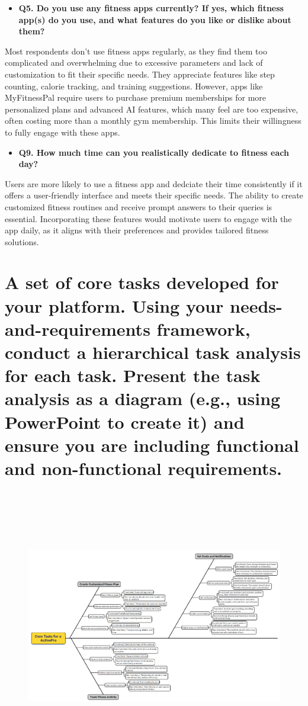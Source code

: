 \documentclass[letterpaper,11pt]{texMemo} %
\begin{document}
\begin{itemize}
	\item \bfseries{Q5. Do you use any fitness apps currently? If yes, which fitness app(s) do you use, and what features do you like or dislike about them?}
\end{itemize}


Most respondents don’t use fitness apps regularly, as they find them too complicated and overwhelming due to excessive parameters and lack of customization to fit their specific needs. They appreciate features like step counting, calorie tracking, and training suggestions. However, apps like MyFitnessPal require users to purchase premium memberships for more personalized plans and advanced AI features, which many feel are too expensive, often costing more than a monthly gym membership. This limits their willingness to fully engage with these apps.

\begin{itemize}
	\item \bfseries{Q9. How much time can you realistically dedicate to fitness each day?
	}
\end{itemize}

Users are more likely to use a fitness app and dedciate their time consistently if it offers a user-friendly interface and meets their specific needs. The ability to create customized fitness routines and receive prompt answers to their queries is essential. Incorporating these features would motivate users to engage with the app daily, as it aligns with their preferences and provides tailored fitness solutions.

\section{A set of core tasks developed for your platform. Using your needs-and-requirements framework, conduct a hierarchical task analysis for each task. Present the task analysis as a diagram (e.g., using PowerPoint to create it) and ensure you are including functional and non-functional requirements. }

\begin{figure}[h]
	\centering
	\includegraphics[width=18cm, height=12cm]{image3}
\end{figure}



\end{document}
